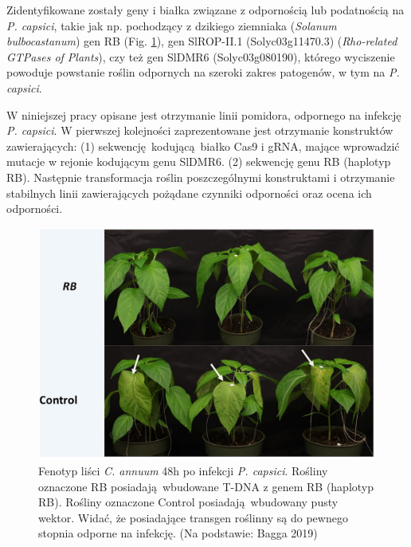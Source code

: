\documentclass[two column, twoside, a4paper]{article}
\begin{document}
Zidentyfikowane zostały geny i białka związane z odpornością lub podatnością na \textit{P. capsici}, takie jak np. pochodzący z dzikiego ziemniaka (\textit{Solanum bulbocastanum}) gen RB (Fig. \ref{fig::c_annuum})\autocite{Song2003, Bagga2019}, gen SlROP-II.1 (Solyc03g11470.3) (\textit{Rho-related GTPases of Plants})\autocite{Yang2020}, czy też gen SlDMR6 (Solyc03g080190), którego wyciszenie powoduje powstanie roślin odpornych na szeroki zakres patogenów, w tym na \textit{P. capsici}\autocite{deToledoThomazella2016}.

W niniejszej pracy opisane jest otrzymanie linii pomidora, odpornego na infekcję \textit{P. capsici}. W pierwszej kolejności zaprezentowane jest otrzymanie konstruktów zawierających: (1) sekwencję kodującą białko Cas9 i gRNA, mające wprowadzić mutacje w rejonie kodującym genu SlDMR6. (2) sekwencję genu RB (haplotyp RB). Następnie transformacja roślin poszczególnymi konstruktami i otrzymanie stabilnych linii zawierających pożądane czynniki odporności oraz ocena ich odporności.

\begin{figure}[tp]
\begin{tcolorbox}
	\centering
	\includegraphics[width=\textwidth]{./figures/c_annuum.png}
	\caption{Fenotyp liści \textit{C. annuum} 48h po infekcji \textit{P. capsici}. Rośliny oznaczone RB posiadają wbudowane T-DNA z genem RB (haplotyp RB). Rośliny oznaczone Control posiadają wbudowany pusty wektor. Widać, że posiadające transgen roślinny są do pewnego stopnia odporne na infekcję. (Na podstawie: Bagga 2019)}\label{fig::c_annuum}
\end{tcolorbox}
\end{figure}
\end{document}
